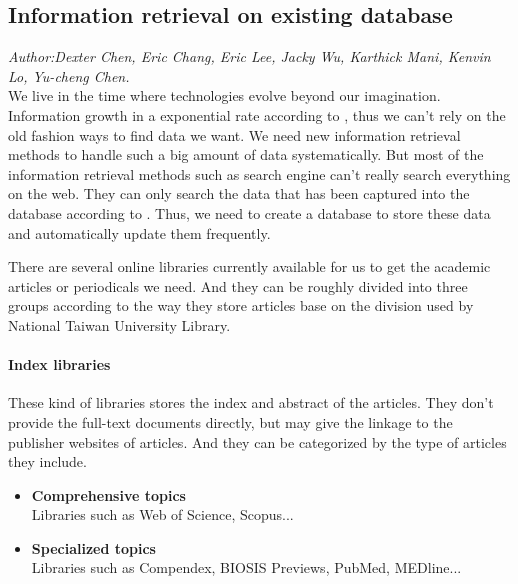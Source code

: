 	
\subsection{Information retrieval on existing database}
\textit{\footnotesize Author:Dexter Chen, Eric Chang, Eric Lee, Jacky Wu, Karthick Mani, Kenvin Lo, Yu-cheng Chen.}\\

We live in the time where technologies evolve beyond our imagination.
Information growth in a exponential rate according to \cite{Tague1981}, thus we can't rely on the old fashion ways to find data we want. 
We need new information retrieval methods to handle such a big amount of data systematically.
But most of the information retrieval methods such as search engine can't really search everything on the web. 
They can only search the data that has been captured into the database according to \cite{Grehan2002}. 
Thus, we need to create a database to store these data and automatically update them frequently.

There are several online libraries currently available for us to get the academic articles or periodicals we need.
And they can be roughly divided into three groups according to the way they store articles base on the division used by National Taiwan University Library.

\paragraph{Index libraries}

	These kind of libraries stores the index and abstract of the articles.
	They don't provide the full-text documents directly, but may give the linkage to the publisher websites of articles.
	And they can be categorized by the type of articles they include.
	
	\begin{itemize}
		
		\item\textbf{Comprehensive topics}\\Libraries such as Web of Science, Scopus...
		\item\textbf{Specialized topics}\\Libraries such as Compendex, BIOSIS Previews, PubMed, MEDline...
		
	\end{itemize}
	
